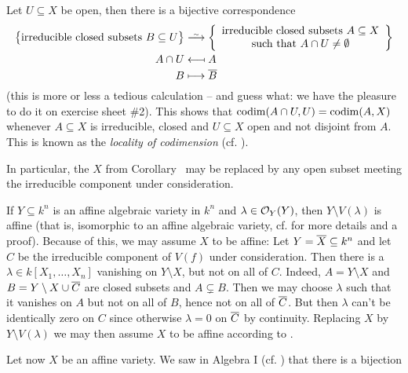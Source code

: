\documentclass[a4paper,parskip=half,numbers=enddot, DIV=12]{scrreprt}
\begin{document}
\begin{rem}
    \begin{alphanumerate}
	   \item{} Let $U\subseteq X$ be open, then there is a bijective correspondence 
        \begin{align*}
	        \big\{\text{irreducible closed subsets }B\subseteq U\big\}&\isomorphism\left\{
	        \begin{array}{c}
		        \text{irreducible closed subsets }A\subseteq X\\
		        \text{such that }A\cap U\not=\emptyset
	        \end{array}
	        \right\}\\
            A\cap U &\longmapsfrom A\\
            B&\longmapsto \overline{B}
        \end{align*}
        (this is more or less a tedious calculation -- and guess what: we have the pleasure to do it on exercise sheet \#2). This shows that $\operatorname{codim} (A\cap U, U)  = \operatorname{codim}(A,X)$ whenever $A\subseteq X$ is irreducible, closed and $U\subseteq X$ open and not disjoint from $A$. This is known as the \emph{locality of codimension} (cf. \cite[Remark~2.1.3]{alg1}).
        \item In particular, the $X$ from Corollary~ may be replaced by any open subset meeting the irreducible component under consideration.
        \item If $Y\subseteq k^n$ is an affine algebraic variety in $k^n$ and $\lambda\in\mathcal{O}_Y(Y)$, then $Y\setminus V(\lambda)$ is affine (that is, isomorphic to an affine algebraic variety, cf. \cite[Proposition~2.2.4]{alg1} for more details and a proof). Because of this, we may assume $X$ to be affine: Let $Y=\overline X\subseteq k^n$ and let $C$ be the irreducible component of $V(f)$ under consideration. Then there is a $\lambda\in k[X_1,\ldots,X_n]$ vanishing on $Y\setminus X$, but not on all of $C$. Indeed, $A=Y\setminus X$ and $B= Y\setminus X\cup\overline C$ are closed subsets and $A\subsetneq B$. Then we may choose $\lambda$ such that it vanishes on $A$ but not on all of $B$, hence not on all of $\overline C$. But then $\lambda$ can't be identically zero on $C$ since otherwise $\lambda=0$ on $\overline C$ by continuity. Replacing $X$ by $Y\setminus V(\lambda)$ we may then assume $X$ to be affine according to .
        \item Let now $X$ be an affine variety. We saw in Algebra I (cf. \cite[Corollary~2.2.2]{alg1}) that there is a bijection

\end{alphanumerate}
\end{rem}
\end{document}
